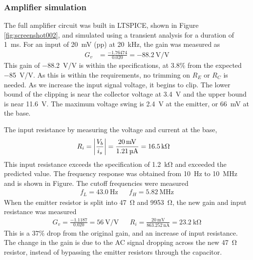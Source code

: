 \documentclass{homework}
\begin{document}
	\subsubsection*{Amplifier simulation}
	The full amplifier circuit was built in LTSPICE, shown in Figure \ref{fig:screenshot002}, and simulated using a transient analysis for a duration of \SI{1}{\ms}. For an input of \SI{20}{\mV} (pp) at \SI{20}{\kHz}, the gain was measured as \begin{align*}
		G_v & = \frac{-1.76474}{0.020} = \SI{-88.2}{\V/\V}
	\end{align*}
	This gain of \SI{-88.2}{\V/\V} is within the specifications, at $3.8\%$ from the expected \SI{-85}{\V/\V}. As this is within the requirements, no trimming on $R_E$ or $R_C$ is needed. As we increase the input signal voltage, it begins to clip. The lower bound of the clipping is near the collector voltage at \SI{3.4}{\V} and the upper bound is near \SI{11.6}{\V}. The maximum voltage swing is \SI{2.4}{\V} at the emitter, or \SI{66}{\mV} at the base. 
	
	The input resistance by measuring the voltage and current at the base, \begin{align*}
		R_i & = \abs{ \frac{V_b}{i_s} } = \frac{\SI{20}{\mV}}{\SI{1.21}{\micro\ampere}} = \SI{16.5}{\kohm}
	\end{align*}
	This input resistance exceeds the specification of \SI{1.2}{\kohm} and exceeded the predicted value.
	The frequency response was obtained from \SI{10}{\Hz} to \SI{10}{\MHz} and is shown in Figure. The cutoff frequencies were measured \begin{align*}
		f_L = \SI{43.0}{\Hz} && f_H = \SI{5.82}{\MHz}
	\end{align*}
	When the emitter resistor is split into \SI{47}{\ohm} and \SI{9953}{\ohm}, the new gain and input resistance was measured \begin{align*}
		G_v = \frac{-1.1187}{0.020} = \SI{56}{\V/\V} && R_i = \frac{\SI{20}{\mV}}{\SI{863.252}{\nA}} = \SI{23.2}{\kohm}
	\end{align*}
	This is a $37\%$ drop from the original gain, and an increase of input resistance. The change in the gain is due to the AC signal dropping across the new \SI{47}{\ohm} resistor, instead of bypassing the emitter resistors through the capacitor.
	
	
\end{document}
